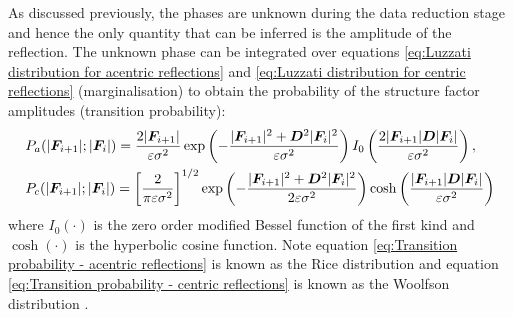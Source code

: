 As discussed previously, the phases are unknown during the data reduction stage and hence the only quantity that can be inferred is the amplitude of the reflection.
The unknown phase can be integrated over equations \ref{eq:Luzzati distribution for acentric reflections} and \ref{eq:Luzzati distribution for centric reflections} (marginalisation) to obtain the probability of the structure factor amplitudes (transition probability):
\begin{align}
    &P_a(|\boldsymbol{F}_{i+1}| ; |\boldsymbol{F}_i|) = \frac{2|\boldsymbol{F}_{i+1}|}{\varepsilon \sigma^2} \exp \left(-\frac{|\boldsymbol{F}_{i+1}|^2 + \boldsymbol{D}^2|\boldsymbol{F}_{i}|^2}{\varepsilon \sigma^2}\right)I_0 \left(\frac{2|\boldsymbol{F}_{i+1}|\boldsymbol{D}|\boldsymbol{F}_{i}|}{\varepsilon \sigma^2}\right), \label{eq:Transition probability - acentric reflections} \\
    &P_c(|\boldsymbol{F}_{i+1}| ; |\boldsymbol{F}_i|) = \left[\frac{2}{\pi \varepsilon \sigma^2}\right]^{1/2} \exp \left(-\frac{|\boldsymbol{F}_{i+1}|^2 + \boldsymbol{D}^2|\boldsymbol{F}_{i}|^2}{2\varepsilon \sigma^2}\right) \cosh \left(\frac{|\boldsymbol{F}_{i+1}|\boldsymbol{D}|\boldsymbol{F}_{i}|}{\varepsilon \sigma^2}\right) \label{eq:Transition probability - centric reflections}
\end{align}
where $I_0(\cdot)$ is the zero order modified Bessel function of the first kind and $\cosh(\cdot)$ is the hyperbolic cosine function.
Note equation \ref{eq:Transition probability - acentric reflections} is known as the Rice distribution and equation \ref{eq:Transition probability - centric reflections} is known as the Woolfson distribution \cite{woolfson1956improvement,mccoy2004liking}.

